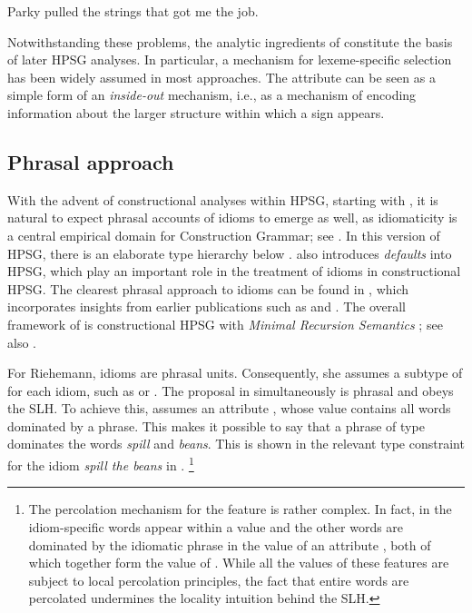 \documentclass[output=paper
	        ,collection
	        ,collectionchapter
 	        ,biblatex
                ,babelshorthands
                ,newtxmath
                ,draftmode
                ,colorlinks, citecolor=brown
]{langscibook}
\begin{document}
\ea \label{strings-relcl}
Parky pulled the strings that got me the job.
\citep[137]{McCawley:81}
\z 

Notwithstanding these problems, 
the analytic ingredients of \citet{KE94a} constitute the basis of later HPSG analyses. In particular, a mechanism for lexeme-specific selection has been widely assumed in most approaches. The attribute  can be seen as a simple form of an \emph{inside-out} mechanism, i.e., as a mechanism of encoding information about the larger structure within which a sign appears. 


\subsection{Phrasal approach}
\label{Sec-Phrasal}

With the advent of constructional analyses within HPSG, starting with \citet{Sag97a}, it is natural to expect phrasal accounts of idioms to emerge as well, as idiomaticity is a central empirical domain for Construction Grammar; see . 
In this version of HPSG, there is an elaborate type hierarchy below . 
\citet{Sag97a} also introduces \emph{defaults} into HPSG, which play an important role in the treatment of idioms in constructional HPSG.
The clearest phrasal approach to idioms can be found in \citet{Riehemann2001a}, which incorporates insights from earlier publications such as \citet{Riehemann97a} and \citet{RB99a}.
%
The overall framework of \citet{Riehemann2001a} is constructional HPSG with \emph{Minimal Recursion Semantics}  \citep{CFMRS95a-u,CFPS2005a}; see also .

For Riehemann, idioms are phrasal units. 
Consequently, she assumes a subtype of  for each idiom, such as  or .
The proposal in \citet{Riehemann2001a} simultaneously is phrasal and obeys the SLH. To achieve this, \citet{Riehemann2001a} assumes an attribute , whose value contains all words dominated by a phrase. This makes it possible to say that a phrase of type  dominates the words \emph{spill} and \emph{beans}. This is shown in the relevant type constraint for the idiom \emph{spill the beans} in .%
\footnote{The percolation mechanism for the feature  is rather complex. In fact, in \cite[Section 5.2.1]{Riehemann2001a} the idiom-specific words appear within a  value and the other words are dominated by the idiomatic phrase in the value of an attribute , both of which together form the value of . While all the values of these features are subject to local percolation principles, the fact that entire words are percolated undermines the locality intuition behind the SLH.}
\end{document}
